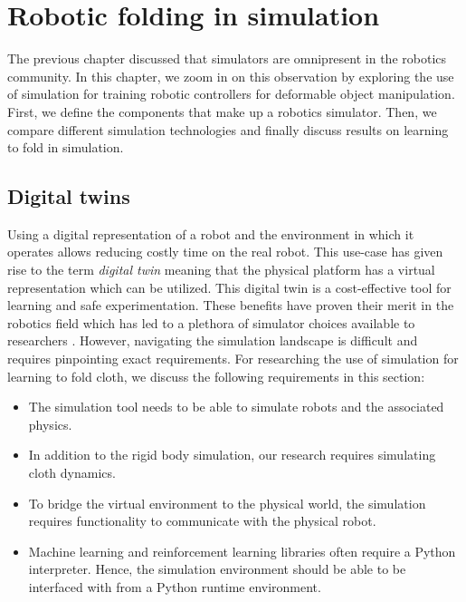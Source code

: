 \documentclass[\home/main.tex]{subfiles}
\begin{document}
\graphicspath{{\home/figures}}


\chapter{Robotic folding in simulation}\label{ch:simulation}


The previous chapter discussed that simulators are omnipresent in the robotics community.
In this chapter, we zoom in on this observation by exploring the use of simulation for training robotic controllers for deformable object manipulation. First, we define the components that make up a robotics simulator. Then, we compare different simulation technologies and finally discuss results on learning to fold in simulation.

\section{Digital twins}

Using a digital representation of a robot and the environment in which it operates allows reducing costly time on the real robot. This use-case has given rise to the term \emph{digital twin} meaning that the physical platform has a virtual representation which can be utilized. This digital twin is a cost-effective tool for learning and safe experimentation. These benefits have proven their merit in the robotics field which has led to a plethora of simulator choices available to researchers \autocite{Collins2021}. However, navigating the simulation landscape is difficult and requires pinpointing exact requirements. For researching the use of simulation for learning to fold cloth, we discuss the following requirements in this section:
\begin{itemize}
    \item The simulation tool needs to be able to simulate robots and the associated physics.
    \item In addition to the rigid body simulation, our research requires simulating cloth dynamics.
    \item To bridge the virtual environment to the physical world, the simulation requires functionality to communicate with the physical robot.
    \item Machine learning and reinforcement learning libraries often require a Python interpreter. Hence, the simulation environment should be able to be interfaced with from a Python runtime environment.
\end{itemize}
\end{document}
